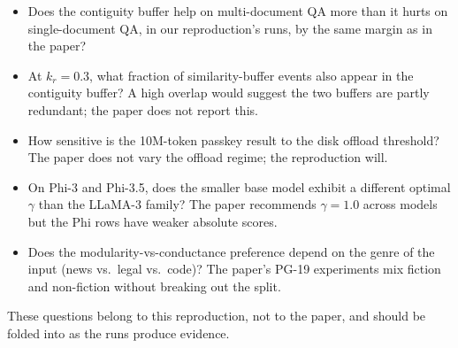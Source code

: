 \begin{itemize}
  \item Does the contiguity buffer help on multi-document QA more than it hurts on single-document QA, in our reproduction's runs, by the same margin as in the paper?
  \item At $k_r = 0.3$, what fraction of similarity-buffer events also appear in the contiguity buffer? A high overlap would suggest the two buffers are partly redundant; the paper does not report this.
  \item How sensitive is the 10M-token passkey result to the disk offload threshold? The paper does not vary the offload regime; the reproduction will.
  \item On Phi-3 and Phi-3.5, does the smaller base model exhibit a different optimal $\gamma$ than the LLaMA-3 family? The paper recommends $\gamma = 1.0$ across models but the Phi rows have weaker absolute scores.
  \item Does the modularity-vs-conductance preference depend on the genre of the input (news vs.\ legal vs.\ code)? The paper's PG-19 experiments mix fiction and non-fiction without breaking out the split.
\end{itemize}

These questions belong to this reproduction, not to the paper, and should be folded into  as the runs produce evidence.
